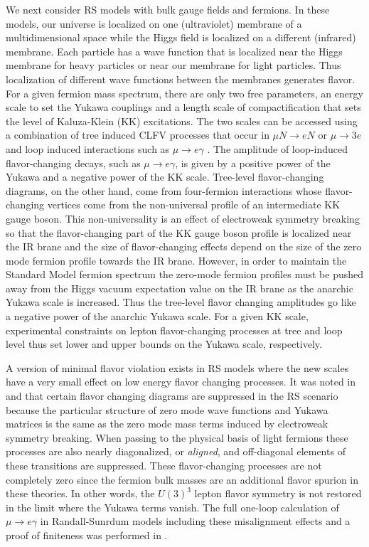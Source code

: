 We next consider RS models with
bulk gauge fields and fermions.   In these models, our universe
 is localized on one (ultraviolet) membrane of a multidimensional 
 space while the Higgs field is localized on a different (infrared) membrane. 
  Each particle has a wave function that is localized near the Higgs 
  membrane for heavy particles or near our membrane 
  for light particles. Thus localization of different wave functions between
   the membranes  generates flavor.
For a given fermion mass spectrum, there are only two free parameters,
 an energy scale to set the Yukawa couplings and a length scale of 
 compactification that sets the level of Kaluza-Klein  (KK) excitations.  The two scales can be accessed using a combination of tree induced CLFV processes that occur in $\mu N\rightarrow e N$ or $\mu\rightarrow 3e$ and loop induced interactions such as $\mu\rightarrow e\gamma$ \cite{hep-ph/0606021,arXiv:1004.2037}. The amplitude of loop-induced
flavor-changing decays, such as $\mu\to e \gamma$, is given by a
positive power of the Yukawa and a negative power of the KK
scale.  Tree-level flavor-changing diagrams, on the other hand, come
from four-fermion interactions whose flavor-changing vertices come
from the non-universal profile of an intermediate KK gauge boson. This
non-universality is an effect of electroweak symmetry breaking so that
the flavor-changing part of the KK gauge boson profile is localized
near the IR brane and the size of flavor-changing effects depend on
the size of the zero mode fermion profile towards the IR
brane. However, in order to maintain the Standard Model fermion
spectrum the zero-mode fermion profiles must be pushed away from the
Higgs vacuum expectation value on the IR brane as the anarchic Yukawa scale is
increased. Thus the tree-level flavor changing amplitudes go like a
negative power of the anarchic Yukawa scale. For a given KK scale,
experimental constraints on lepton flavor-changing processes at tree
and loop level thus set lower and upper bounds on the Yukawa scale,
respectively.

A version of minimal flavor violation exists in RS models where the new
 scales have a very small effect on low energy flavor changing processes.  
 It was noted in \cite{hep-ph/0606021} and \cite{Agashe:2004cp} that
certain flavor changing diagrams are suppressed in the RS scenario
because the particular structure of zero mode wave functions and
Yukawa matrices is the same as the zero mode mass terms induced by
electroweak symmetry breaking. When passing to the physical basis
of light fermions these processes are also nearly diagonalized, or
\textit{aligned}, and off-diagonal elements of these transitions are
suppressed. These flavor-changing processes are not completely zero 
since the fermion bulk masses are an additional flavor spurion
in these theories. In other words, the $U(3)^3$ lepton flavor 
symmetry is not restored in the limit where the Yukawa terms vanish. 
%
The full one-loop calculation of $\mu\to e \gamma$ in Randall-Sunrdum
models including these misalignment effects and a proof of finiteness 
was performed in \cite{arXiv:1004.2037}.

